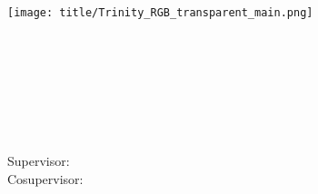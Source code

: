 \begin{titlepage}

\center %



\texttt{[image: title/Trinity\_RGB\_transparent\_main.png]}\\[1cm] 

\Large \school\\[1.5cm] %
\ifdefined\department
\large \department\\[1.5cm] %
\fi

\makeatletter
{ \huge \bfseries \thesistitle}\\[1.5cm] %
 


\ifdefined\authorid
\authorname\\ %
\authorid\\[2cm] %
\else
\authorname\\[2cm] %
\fi


Supervisor: \supervisor\\[2cm] %
\ifdefined\cosupervisor
Cosupervisor: \cosupervisor\\[2cm] %
\fi




\end{titlepage}
